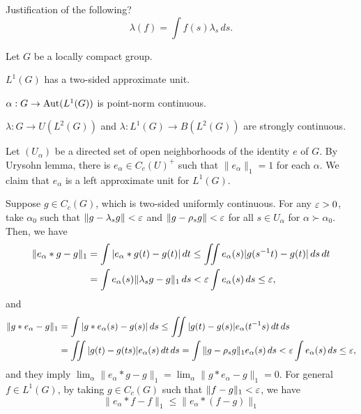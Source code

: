\documentclass{../../large}
\begin{document}
\begin{prb}
\end{prb}

Justification of the following?
\[\lambda(f)=\int f(s)\lambda_s\,ds.\]

\begin{prb}
Let $G$ be a locally compact group.
\begin{parts}
\item $L^1(G)$ has a two-sided approximate unit.
\item $\alpha:G\to\operatorname{Aut}(L^1(G))$ is point-norm continuous.
\item $\lambda:G\to U(L^2(G))$ and $\lambda:L^1(G)\to B(L^2(G))$ are strongly continuous.
\end{parts}
\begin{pf}
Let $(U_\alpha)$ be a directed set of open neighborhoods of the identity $e$ of $G$.
By Urysohn lemma, there is $e_\alpha\in C_c(U)^+$ such that $\|e_\alpha\|_1=1$ for each $\alpha$.
We claim that $e_\alpha$ is a left approximate unit for $L^1(G)$.

Suppose $g\in C_c(G)$, which is two-sided uniformly continuous.
For any $\varepsilon>0$, take $\alpha_0$ such that $\|g-\lambda_sg\|<\varepsilon$ and $\|g-\rho_sg\|<\varepsilon$ for all $s\in U_\alpha$ for $\alpha\succ\alpha_0$.
Then, we have
\begin{align*}
\|e_\alpha*g-g\|_1
&=\int|e_\alpha*g(t)-g(t)|\,dt\le\iint e_\alpha(s)|g(s^{-1}t)-g(t)|\,ds\,dt\\
&=\int e_\alpha(s)\|\lambda_sg-g\|_1\,ds<\varepsilon\int e_\alpha(s)\,ds\le\varepsilon,
\end{align*}
and
\begin{align*}
\|g*e_\alpha-g\|_1
&=\int|g*e_\alpha(s)-g(s)|\,ds\le\iint|g(t)-g(s)|e_\alpha(t^{-1}s)\,dt\,ds\\
&=\iint|g(t)-g(ts)|e_\alpha(s)\,dt\,ds=\int\|g-\rho_sg\|_1e_\alpha(s)\,ds<\varepsilon\int e_\alpha(s)\,ds\le\varepsilon,
\end{align*}
and they imply $\lim_\alpha\|e_\alpha*g-g\|_1=\lim_\alpha\|g*e_\alpha-g\|_1=0$.
For general $f\in L^1(G)$, by taking $g\in C_c(G)$ such that $\|f-g\|_1<\varepsilon$, we have
\[\|e_\alpha*f-f\|_1\le\|e_\alpha*(f-g)\|_1\]
\end{pf}

\end{prb}
\end{document}
